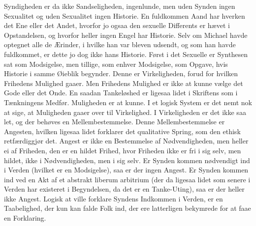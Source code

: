 \documentclass[12pt,a4paper]{article}
\begin{document}
Syndigheden er da ikke Sandseligheden, ingenlunde, men uden Synden ingen Sexualitet og uden Sexualitet ingen Historie. En fuldkommen Aand har hverken det Ene eller det Andet, hvorfor jo ogsaa den sexuelle Differents er hævet i Opstandelsen, og hvorfor heller ingen Engel har Historie. Selv om Michael havde optegnet alle de Ærinder, i hvilke han var bleven udsendt, og som han havde fuldkommet, er dette jo dog ikke hans Historie. Først i det Sexuelle er Synthesen sat som Modsigelse, men tillige, som enhver Modsigelse, som Opgave, hvis Historie i samme Øieblik begynder. Denne er Virkeligheden, forud for hvilken Frihedens Mulighed gaaer. Men Frihedens Mulighed er ikke at kunne vælge det Gode eller det Onde. En saadan Tankeløshed er ligesaa lidet i Skriftens som i Tænkningens Medfør. Muligheden er at kunne. I et logisk System er det nemt nok at sige, at Muligheden gaaer over til Virkelighed. I Virkeligheden er det ikke saa let, og der behøves en Mellembestemmelse. Denne Mellembestemmelse er Angesten, hvilken ligesaa lidet forklarer det qualitative Spring, som den ethisk retfærdiggjør det. Angest er ikke en Bestemmelse af Nødvendigheden, men heller ei af Friheden, den er en hildet Frihed, hvor Friheden ikke er fri i sig selv, men hildet, ikke i Nødvendigheden, men i sig selv. Er Synden kommen nødvendigt ind i Verden (hvilket er en Modsigelse), saa er der ingen Angest. Er Synden kommen ind ved en Akt af et abstrakt liberum arbitrium (der da ligesaa lidet som senere i Verden har existeret i Begyndelsen, da det er en Tanke-Uting), saa er der heller ikke Angest. Logisk at ville forklare Syndens Indkommen i Verden, er en Taabelighed, der kun kan falde Folk ind, der ere latterligen bekymrede for at faae en Forklaring.
\end{document}
